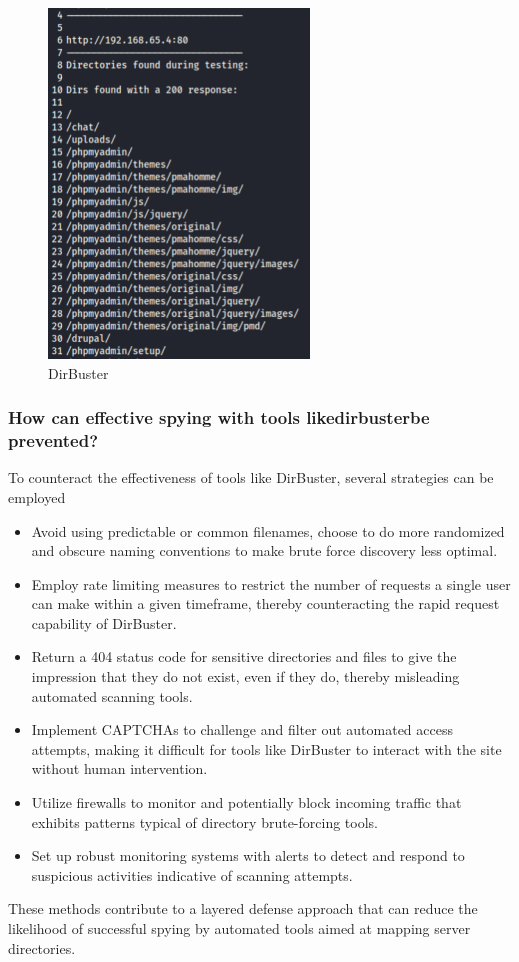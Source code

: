 \begin{figure}[H]
    \centering
    \includegraphics[width=0.4\linewidth]{pic/DirBuster.png}
    \caption{DirBuster}
    \label{fig:DirBuster}
\end{figure}


\subsubsection{How can effective spying with tools likedirbusterbe prevented?}

To counteract the effectiveness of tools like DirBuster, several strategies can be employed

\begin{itemize}
    \item Avoid using predictable or common filenames, choose to do more randomized and obscure naming conventions to make brute force discovery less optimal.
    \item Employ rate limiting measures to restrict the number of requests a single user can make within a given timeframe, thereby counteracting the rapid request capability of DirBuster.
    \item Return a 404 status code for sensitive directories and files to give the impression that they do not exist, even if they do, thereby misleading automated scanning tools.
    \item Implement CAPTCHAs to challenge and filter out automated access attempts, making it difficult for tools like DirBuster to interact with the site without human intervention.
    \item Utilize firewalls to monitor and potentially block incoming traffic that exhibits patterns typical of directory brute-forcing tools.
    \item Set up robust monitoring systems with alerts to detect and respond to suspicious activities indicative of scanning attempts.
\end{itemize}
These methods contribute to a layered defense approach that can reduce the likelihood of successful spying by automated tools aimed at mapping server directories.


